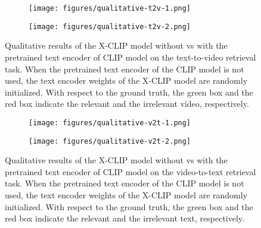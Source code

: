 \documentclass{article}
\begin{document}
\begin{figure}[htbp]
  \begin{subfigure}[b]{\textwidth}
    \centering
    \texttt{[image: figures/qualitative-t2v-1.png]}
    \caption{}
    \label{fig:t2v1}
  \end{subfigure}
  \vfill
  \begin{subfigure}[b]{\textwidth}
    \centering
    \texttt{[image: figures/qualitative-t2v-2.png]}
    \caption{}
    \label{fig:t2v2}
  \end{subfigure}
  
  \caption{Qualitative results of the X-CLIP model without vs with the pretrained text encoder of CLIP model on the text-to-video retrieval task. When the pretrained text encoder of the CLIP model is not used, the text encoder weights of the X-CLIP model are randomly initialized. With respect to the ground truth, the green box and the red box indicate the relevant and the irrelevant video, respectively.}
  \label{fig:qual-t2v}
\end{figure}



\begin{figure}[t!]
  \centering  
  \begin{subfigure}[b]{\textwidth}
    \centering
    \texttt{[image: figures/qualitative-v2t-1.png]}
    \caption{}
    \label{fig:v2t1}
  \end{subfigure}
  \vfill
  \begin{subfigure}[b]{\textwidth}
    \centering
    \texttt{[image: figures/qualitative-v2t-2.png]}
    \caption{}
    \label{fig:v2t2}
  \end{subfigure}
  
  \caption{Qualitative results of the X-CLIP model without vs with the pretrained text encoder of CLIP model on the video-to-text retrieval task. When the pretrained text encoder of the CLIP model is not used, the text encoder weights of the X-CLIP model are randomly initialized. With respect to the ground truth, the green box and the red box indicate the relevant and the irrelevant text, respectively.}
  \label{fig:qual-v2t}
\end{figure}
\end{document}
